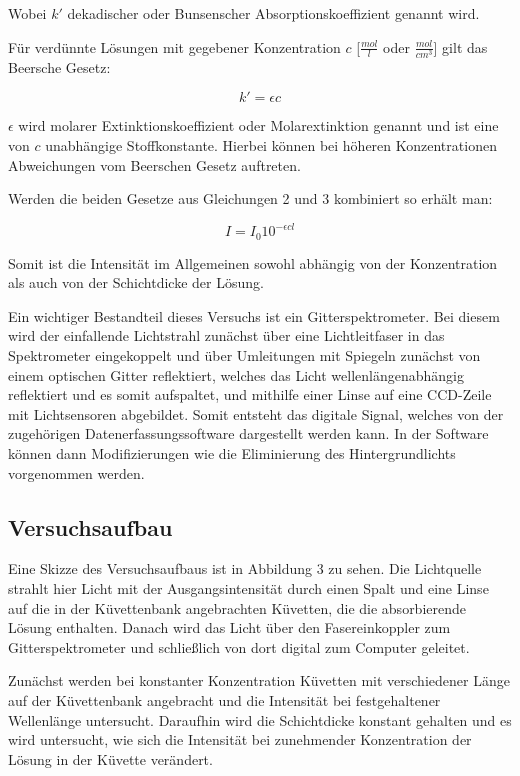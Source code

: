 \documentclass{article}
\begin{document}
Wobei $k'$ dekadischer oder Bunsenscher Absorptionskoeffizient genannt wird.

Für verdünnte Lösungen mit gegebener Konzentration $c$ [$\frac{mol}{l}$ oder $\frac{mol}{cm^3}$] gilt das Beersche Gesetz:

\begin{equation}
    k' = \epsilon c
\end{equation}

$\epsilon$ wird molarer Extinktionskoeffizient oder Molarextinktion genannt und ist eine von $c$ unabhängige Stoffkonstante. Hierbei können bei höheren Konzentrationen Abweichungen vom Beerschen Gesetz auftreten. 

Werden die beiden Gesetze aus Gleichungen 2 und 3 kombiniert so erhält man:

\begin{equation}
    I = I_0 10^{-\epsilon c l}
\end{equation}

Somit ist die Intensität im Allgemeinen sowohl abhängig von der Konzentration als auch von der Schichtdicke der Lösung. 

Ein wichtiger Bestandteil dieses Versuchs ist ein Gitterspektrometer. Bei diesem wird der einfallende Lichtstrahl zunächst über eine Lichtleitfaser in das Spektrometer eingekoppelt und über Umleitungen mit Spiegeln zunächst von einem optischen Gitter reflektiert, welches das Licht wellenlängenabhängig reflektiert und es somit aufspaltet, und mithilfe einer Linse auf eine CCD-Zeile mit Lichtsensoren abgebildet. Somit entsteht das digitale Signal, welches von der zugehörigen Datenerfassungssoftware dargestellt werden kann. In der Software können dann Modifizierungen wie die Eliminierung des Hintergrundlichts vorgenommen werden.

\subsection{Versuchsaufbau}

Eine Skizze des Versuchsaufbaus ist in Abbildung 3 zu sehen. Die Lichtquelle strahlt hier Licht mit der Ausgangsintensität durch einen Spalt und eine Linse auf die in der Küvettenbank angebrachten Küvetten, die die absorbierende Lösung enthalten. Danach wird das Licht über den Fasereinkoppler zum Gitterspektrometer und schließlich von dort digital zum Computer geleitet.

Zunächst werden bei konstanter Konzentration Küvetten mit verschiedener Länge auf der Küvettenbank angebracht und die Intensität bei festgehaltener Wellenlänge untersucht. Daraufhin wird die Schichtdicke konstant gehalten und es wird untersucht, wie sich die Intensität bei zunehmender Konzentration der Lösung in der Küvette verändert.
\end{document}
